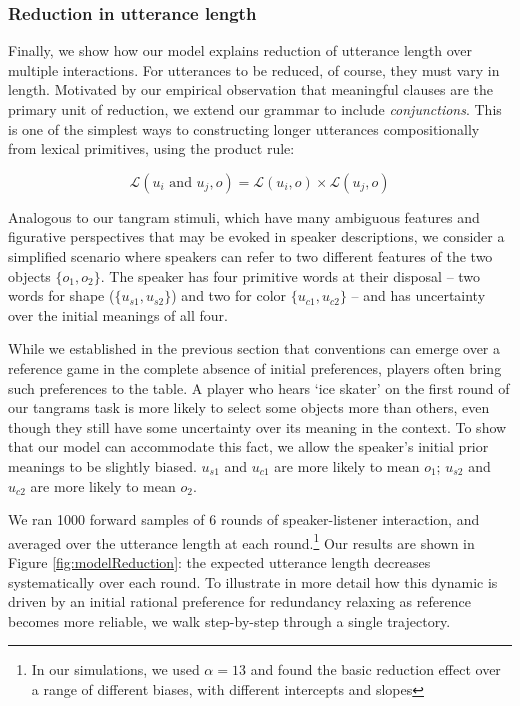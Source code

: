 \documentclass[10pt, letterpaper]{article}
\begin{document}
\subsubsection{Reduction in utterance
length}\label{reduction-in-utterance-length}

Finally, we show how our model explains reduction of utterance length
over multiple interactions. For utterances to be reduced, of course,
they must vary in length. Motivated by our empirical observation that
meaningful clauses are the primary unit of reduction, we extend our
grammar to include \emph{conjunctions}. This is one of the simplest ways
to constructing longer utterances compositionally from lexical
primitives, using the product rule:

\[\mathcal{L}(u_i \textrm{ and } u_j, o) = \mathcal{L}(u_i, o) \times \mathcal{L}(u_j, o)\]

Analogous to our tangram stimuli, which have many ambiguous features and
figurative perspectives that may be evoked in speaker descriptions, we
consider a simplified scenario where speakers can refer to two different
features of the two objects \(\{o_1, o_2\}\). The speaker has four
primitive words at their disposal -- two words for shape
(\(\{u_{s1}, u_{s2}\}\)) and two for color \(\{u_{c1}, u_{c2}\}\) -- and
has uncertainty over the initial meanings of all four.

While we established in the previous section that conventions can emerge
over a reference game in the complete absence of initial preferences,
players often bring such preferences to the table. A player who hears
`ice skater' on the first round of our tangrams task is more likely to
select some objects more than others, even though they still have some
uncertainty over its meaning in the context. To show that our model can
accommodate this fact, we allow the speaker's initial prior meanings to
be slightly biased. \(u_{s1}\) and \(u_{c1}\) are more likely to mean
\(o_1\); \(u_{s2}\) and \(u_{c2}\) are more likely to mean \(o_2\).

We ran 1000 forward samples of 6 rounds of speaker-listener interaction,
and averaged over the utterance length at each round.\footnote{In our
  simulations, we used \(\alpha = 13\) and found the basic reduction
  effect over a range of different biases, with different intercepts and
  slopes} Our results are shown in Figure \ref{fig:modelReduction}: the
expected utterance length decreases systematically over each round. To
illustrate in more detail how this dynamic is driven by an initial
rational preference for redundancy relaxing as reference becomes more
reliable, we walk step-by-step through a single trajectory.
\end{document}

